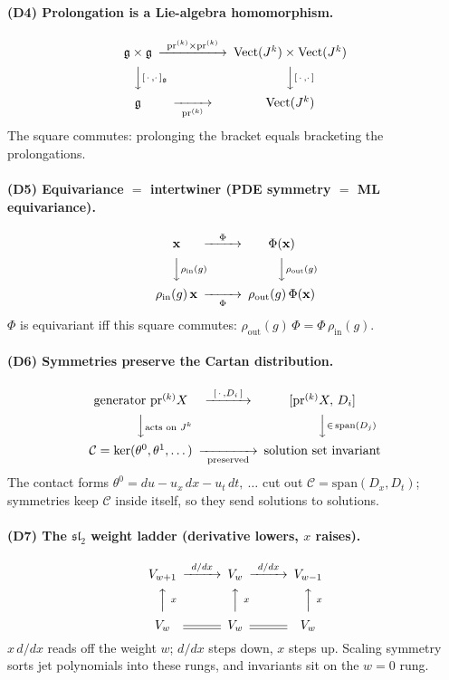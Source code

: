 \documentclass[11pt]{article}
\theoremstyle{definition}
\theoremstyle{remark}
\newcommand{\g}{\mathfrak{g}}
\newcommand{\Vect}{\operatorname{Vect}}
\newcommand{\sltwo}{\mathfrak{sl}_2}
\begin{document}
\paragraph{(D4) Prolongation is a Lie-algebra homomorphism.}
\[
\begin{CD}
\g\times\g @>{\ \mathrm{pr}^{(k)}\times\mathrm{pr}^{(k)}\ }>> \Vect(J^k)\times\Vect(J^k)\\
@VV{[\,\cdot\,,\cdot\,]_\g}V @VV{[\,\cdot\,,\cdot\,]}V\\
\g @>>{\ \mathrm{pr}^{(k)}\ }> \Vect(J^k)
\end{CD}
\]
The square commutes: prolonging the bracket equals bracketing the prolongations.

\paragraph{(D5) Equivariance $=$ intertwiner (PDE symmetry $=$ ML equivariance).}
\[
\begin{CD}
\mathbf{x} @>{\ \Phi\ }>> \Phi(\mathbf{x})\\
@VV{\rho_{\mathrm{in}}(g)}V @VV{\rho_{\mathrm{out}}(g)}V\\
\rho_{\mathrm{in}}(g)\,\mathbf{x} @>>{\ \Phi\ }> \rho_{\mathrm{out}}(g)\,\Phi(\mathbf{x})
\end{CD}
\]
$\Phi$ is equivariant iff this square commutes: $\rho_{\mathrm{out}}(g)\,\Phi=\Phi\,\rho_{\mathrm{in}}(g)$.

\paragraph{(D6) Symmetries preserve the Cartan distribution.}
\[
\begin{CD}
\text{generator }\mathrm{pr}^{(k)}X @>{\ [\,\cdot\,,D_i\,]\ }>> [\mathrm{pr}^{(k)}X,\,D_i]\\
@VV{\text{acts on }J^k}V @VV{\in\,\mathrm{span}(D_j)}V\\
\mathcal{C}=\ker(\theta^0,\theta^1,\dots) @>>{\ \text{preserved}\ }> \text{solution set invariant}
\end{CD}
\]
The contact forms $\theta^0=du-u_x\,dx-u_t\,dt,\ \dots$ cut out $\mathcal{C}=\mathrm{span}(D_x,D_t)$;
symmetries keep $\mathcal{C}$ inside itself, so they send solutions to solutions.

\paragraph{(D7) The $\sltwo$ weight ladder (derivative lowers, $x$ raises).}
\[
\begin{CD}
V_{w+1} @>{\ d/dx\ }>> V_{w} @>{\ d/dx\ }>> V_{w-1}\\
@AA{\ x\ }A @AA{\ x\ }A @AA{\ x\ }A\\
V_{w} @= V_{w} @= V_{w}
\end{CD}
\]
$x\,d/dx$ reads off the weight $w$; $d/dx$ steps down, $x$ steps up. Scaling symmetry sorts jet
polynomials into these rungs, and invariants sit on the $w=0$ rung.
\end{document}
